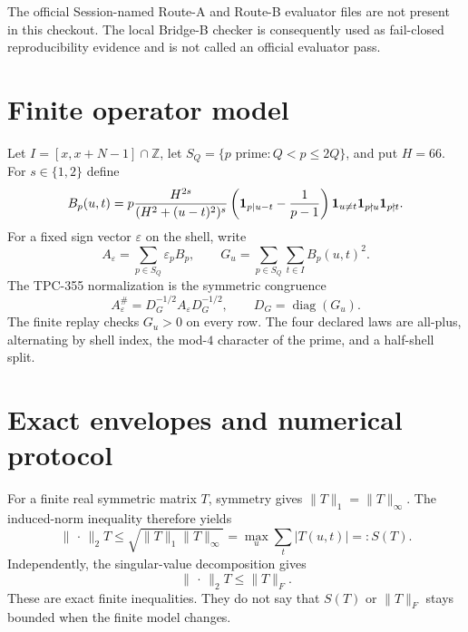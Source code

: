 \documentclass[10pt]{article}
\newcommand{\opnorm}{\lVert\,\cdot\,\rVert_2}
\begin{document}
The official Session-named Route-A and Route-B evaluator files are not present
in this checkout.  The local Bridge-B checker is consequently used as
fail-closed reproducibility evidence and is not called an official evaluator
pass.

\section{Finite operator model}

Let $I=[x,x+N-1]\cap\mathbb Z$, let
$S_Q=\{p\text{ prime}:Q<p\leq 2Q\}$, and put $H=66$.  For
$s\in\{1,2\}$ define
\begin{equation}
 B_p(u,t)=p\frac{H^{2s}}{(H^2+(u-t)^2)^s}
 \left({\bf1}_{p\mid u-t}-\frac{1}{p-1}\right)
 {\bf1}_{u\ne t}{\bf1}_{p\nmid u}{\bf1}_{p\nmid t}.
 \label{eq:block}
\end{equation}
For a fixed sign vector $\varepsilon$ on the shell, write
\begin{equation}
 A_\varepsilon=\sum_{p\in S_Q}\varepsilon_p B_p,
 \qquad
 G_u=\sum_{p\in S_Q}\sum_{t\in I}B_p(u,t)^2.
 \label{eq:raw}
\end{equation}
The TPC-355 normalization is the symmetric congruence
\begin{equation}
 A_\varepsilon^{\#}=D_G^{-1/2}A_\varepsilon D_G^{-1/2},
 \qquad D_G=\operatorname{diag}(G_u).
 \label{eq:norm}
\end{equation}
The finite replay checks $G_u>0$ on every row.  The four declared laws are
all-plus, alternating by shell index, the mod-$4$ character of the prime,
and a half-shell split.

\section{Exact envelopes and numerical protocol}

For a finite real symmetric matrix $T$, symmetry gives
$\lVert T\rVert_1=\lVert T\rVert_\infty$.  The induced-norm inequality
therefore yields
\begin{equation}
 \opnorm{T}\leq \sqrt{\lVert T\rVert_1\lVert T\rVert_\infty}
 =\max_u\sum_t|T(u,t)|=:S(T).
 \label{eq:schur}
\end{equation}
Independently, the singular-value decomposition gives
\begin{equation}
 \opnorm{T}\leq \lVert T\rVert_F.
 \label{eq:frob}
\end{equation}
These are exact finite inequalities.  They do not say that $S(T)$ or
$\lVert T\rVert_F$ stays bounded when the finite model changes.
\end{document}
